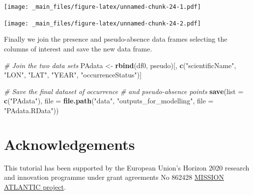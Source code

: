 \documentclass[
]{book}
\newenvironment{Shaded}{\begin{snugshade}}{\end{snugshade}}
\newcommand{\AttributeTok}[1]{\textcolor[rgb]{0.13,0.29,0.53}{#1}}
\newcommand{\CommentTok}[1]{\textcolor[rgb]{0.56,0.35,0.01}{\textit{#1}}}
\newcommand{\DecValTok}[1]{\textcolor[rgb]{0.00,0.00,0.81}{#1}}
\newcommand{\FloatTok}[1]{\textcolor[rgb]{0.00,0.00,0.81}{#1}}
\newcommand{\FunctionTok}[1]{\textcolor[rgb]{0.13,0.29,0.53}{\textbf{#1}}}
\newcommand{\NormalTok}[1]{#1}
\newcommand{\OtherTok}[1]{\textcolor[rgb]{0.56,0.35,0.01}{#1}}
\newcommand{\SpecialCharTok}[1]{\textcolor[rgb]{0.81,0.36,0.00}{\textbf{#1}}}
\newcommand{\StringTok}[1]{\textcolor[rgb]{0.31,0.60,0.02}{#1}}
\begin{document}
\texttt{[image: \_main\_files/figure-latex/unnamed-chunk-24-1.pdf]}

\begin{Shaded}
\end{Shaded}

\texttt{[image: \_main\_files/figure-latex/unnamed-chunk-24-2.pdf]}

Finally we join the presence and pseudo-absence data frames selecting the columns of interest and save the new data frame.

\begin{Shaded}
\begin{Highlighting}[]
\CommentTok{\# Join the two data sets}
\NormalTok{PAdata }\OtherTok{\textless{}{-}} \FunctionTok{rbind}\NormalTok{(df0, pseudo)[, }\FunctionTok{c}\NormalTok{(}\StringTok{"scientificName"}\NormalTok{,}
    \StringTok{"LON"}\NormalTok{, }\StringTok{"LAT"}\NormalTok{, }\StringTok{"YEAR"}\NormalTok{, }\StringTok{"occurrenceStatus"}\NormalTok{)]}

\CommentTok{\# Save the final dataset of occurrence}
\CommentTok{\# and pseudo{-}absence points}
\FunctionTok{save}\NormalTok{(}\AttributeTok{list =} \FunctionTok{c}\NormalTok{(}\StringTok{"PAdata"}\NormalTok{), }\AttributeTok{file =} \FunctionTok{file.path}\NormalTok{(}\StringTok{"data"}\NormalTok{,}
    \StringTok{"outputs\_for\_modelling"}\NormalTok{, }\AttributeTok{file =} \StringTok{"PAdata.RData"}\NormalTok{))}
\end{Highlighting}
\end{Shaded}

\chapter{Acknowledgements}\label{acknowledgements}

This tutorial has been supported by the European Union's Horizon 2020 research and innovation programme under grant agreements No 862428 \href{https://missionatlantic.eu/}{MISSION ATLANTIC project}.

  
\end{document}
